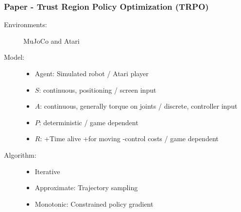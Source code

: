 \documentclass{beamer}
\begin{document}

\begin{frame} %
    \frametitle{Paper \thepapercounter - Trust Region Policy Optimization (TRPO)%
    }
    \begin{description}
        \item[Environments:] MuJoCo and Atari
        \item[Model:]
        \begin{itemize}
            \item Agent: Simulated robot / Atari player
            \item $S$: continuous, positioning / screen input
            \item $A$: continuous, generally torque on joints / discrete, controller input
            \item $P$: deterministic / game dependent
            \item $R$: +Time alive +for moving -control costs / game dependent
        \end{itemize}
        \item[Algorithm:]
        \begin{itemize}
            \item Iterative
            \item Approximate: Trajectory sampling
            \item Monotonic: Constrained policy gradient
        \end{itemize}
    \end{description}
\end{frame}
\end{document}
